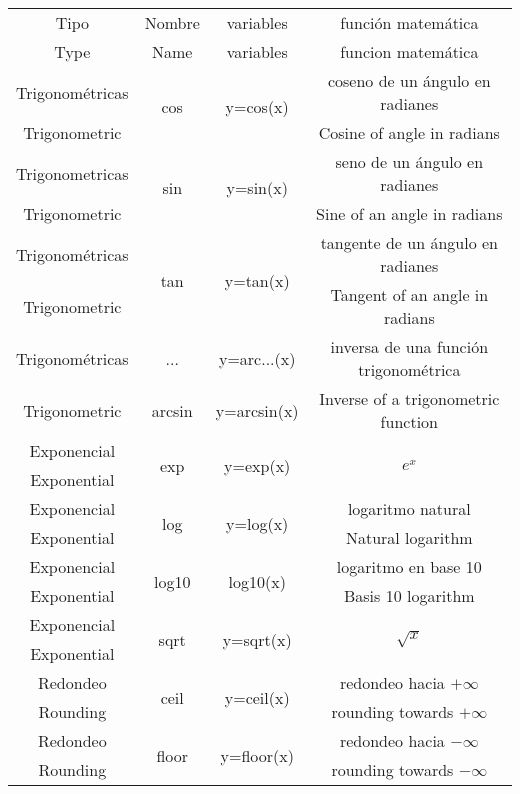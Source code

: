 \begin{table}
\label{tabfun}
\begin{tabular}{c|c|c|c}
Tipo&Nombre&variables&función matemática\\
Type&Name&variables&funcion matemática\\
\hline
\hline

Trigonométricas&\multirow{2}{*}{cos}&\multirow{2}{4em}{y=cos(x)}&coseno de un ángulo en radianes\\
Trigonometric& & & Cosine of angle in radians\\
\hline
Trigonometricas&\multirow{2}{*}{sin}&\multirow{2}{4em}{y=sin(x)}&seno de un ángulo en radianes\\
Trigonometric& & &Sine of an angle in radians\\
\hline
Trigonométricas&\multirow{2}{*}{tan}&\multirow{2}{4em}{y=tan(x)}&tangente de un ángulo en radianes\\
Trigonometric & & &Tangent of an angle in radians\\
\hline
Trigonométricas &...&y=arc...(x)&inversa de una función trigonométrica\\
Trigonometric &arcsin&y=arcsin(x)& Inverse of a trigonometric function\\
\hline
\hline
Exponencial&\multirow{2}{*}{exp}&\multirow{2}{*}{y=exp(x)}&\multirow{2}{*}{$e^x$}\\
Exponential& & & \\
\hline
Exponencial&\multirow{2}{*}{log}&\multirow{2}{*}{y=log(x)}&logaritmo natural\\
Exponential & & & Natural logarithm\\
\hline
Exponencial&\multirow{2}{*}{log10}&\multirow{2}{*}{log10(x)}&logaritmo en base 10\\
Exponential& & & Basis 10 logarithm\\
\hline
Exponencial&\multirow{2}{*}{sqrt}&\multirow{2}{*}{y=sqrt(x)}&\multirow{2}{*}{$\sqrt{x}$}\\
Exponential& & & \\
\hline
\hline
Redondeo&\multirow{2}{*}{ceil}&\multirow{2}{*}{y=ceil(x)}& redondeo hacia $+\infty$\\
Rounding& & & rounding towards $+\infty$\\
\hline
Redondeo&\multirow{2}{*}{floor}&\multirow{2}{*}{y=floor(x)}&redondeo hacia $-\infty$\\
Rounding& & & rounding towards $-\infty$ \\

\end{tabular}
\end{table}
